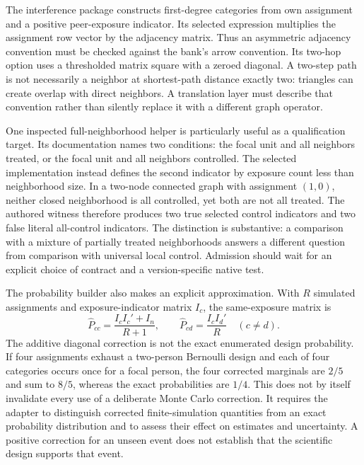 The interference package constructs first-degree categories from own assignment and a positive peer-exposure indicator. Its selected expression multiplies the assignment row vector by the adjacency matrix. Thus an asymmetric adjacency convention must be checked against the bank's arrow convention. Its two-hop option uses a thresholded matrix square with a zeroed diagonal. A two-step path is not necessarily a neighbor at shortest-path distance exactly two: triangles can create overlap with direct neighbors. A translation layer must describe that convention rather than silently replace it with a different graph operator.~\citep{exec25_rnet_exposure}

One inspected full-neighborhood helper is particularly useful as a qualification target. Its documentation names two conditions: the focal unit and all neighbors treated, or the focal unit and all neighbors controlled. The selected implementation instead defines the second indicator by exposure count less than neighborhood size. In a two-node connected graph with assignment $(1,0)$, neither closed neighborhood is all controlled, yet both are not all treated. The authored witness therefore produces two true selected control indicators and two false literal all-control indicators. The distinction is substantive: a comparison with a mixture of partially treated neighborhoods answers a different question from comparison with universal local control. Admission should wait for an explicit choice of contract and a version-specific native test.~\citep{exec25_rnet_exposure,exec25_rnet_choice}

The probability builder also makes an explicit approximation. With $R$ simulated assignments and exposure-indicator matrix $I_c$, the same-exposure matrix is
\[
 \widehat P_{cc}=\frac{I_cI_c'+I_n}{R+1},
 \qquad
 \widehat P_{cd}=\frac{I_cI_d'}{R}\quad(c\ne d).
\]
The additive diagonal correction is not the exact enumerated design probability. If four assignments exhaust a two-person Bernoulli design and each of four categories occurs once for a focal person, the four corrected marginals are $2/5$ and sum to $8/5$, whereas the exact probabilities are $1/4$. This does not by itself invalidate every use of a deliberate Monte Carlo correction. It requires the adapter to distinguish corrected finite-simulation quantities from an exact probability distribution and to assess their effect on estimates and uncertainty. A positive correction for an unseen event does not establish that the scientific design supports that event.~\citep{exec25_rnet_exposure,exec25_rnet_choice}

